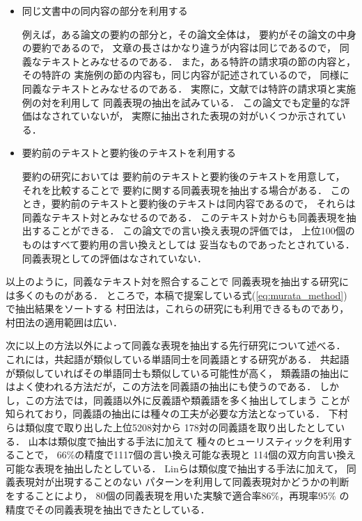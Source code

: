 \begin{itemize}
\item 
  同じ文書中の同内容の部分を利用する

  例えば，ある論文の要約の部分と，その論文全体は，
  要約がその論文の中身の要約であるので，
  文章の長さはかなり違うが内容は同じであるので，
  同義なテキストとみなせるのである．
  また，ある特許の請求項の節の内容と，その特許の
  実施例の節の内容も，同じ内容が記述されているので，
  同様に同義なテキストとみなせるのである．
  実際に，文献\cite{Murata_ntcir3_patent}では特許の請求項と実施例の対を利用して
  同義表現の抽出を試みている．
  この論文でも定量的な評価はなされていないが，
  実際に抽出された表現の対がいくつか示されている．
  
\item 
  要約前のテキストと要約後のテキストを利用する
  
  要約の研究においては
  要約前のテキストと要約後のテキストを用意して，
  それを比較することで
  要約に関する同義表現を抽出する場合がある．
  このとき，要約前のテキストと要約後のテキストは同内容であるので，
  それらは同義なテキスト対とみなせるのである．
  このテキスト対からも同義表現を抽出することができる\cite{Kato1999}．
  この論文での言い換え表現の評価では，
  上位100個のものはすべて要約用の言い換えとしては
  妥当なものであったとされている．
  同義表現としての評価はなされていない．

\end{itemize}

以上のように，同義なテキスト対を照合することで
同義表現を抽出する研究には多くのものがある．
ところで，本稿で提案している式(\ref{eq:murata_method})で抽出結果をソートする
村田法は，これらの研究にも利用できるものであり，
村田法の適用範囲は広い．

次に以上の方法以外によって同義な表現を抽出する先行研究について述べる．
これには，共起語が類似している単語同士を同義語とする研究がある\cite{shimomura93,lin_coling98,yamamoto_kazu_nlp2002,Dekang_Lin_IJCAI03}．
共起語が類似していればその単語同士も類似している可能性が高く，
類義語の抽出\cite{hindle90}にはよく使われる方法だが，この方法を同義語の抽出にも使うのである．
しかし，この方法では，同義語以外に反義語や類義語を多く抽出してしまう
ことが知られており，同義語の抽出には種々の工夫が必要な方法となっている．
下村ら\cite{shimomura93}は類似度で取り出した上位5208対から
178対の同義語を取り出したとしている．
山本\cite{yamamoto_kazu_nlp2002}は類似度で抽出する手法に加えて
種々のヒューリスティックを利用することで，
66\%の精度で1117個の言い換え可能な表現と
114個の双方向言い換え可能な表現を抽出したとしている．
Linら\cite{Dekang_Lin_IJCAI03}は類似度で抽出する手法に加えて，
同義表現対が出現することのない
パターンを利用して同義表現対かどうかの判断をすることにより，
80個の同義表現を用いた実験で適合率86\%，再現率95\%
の精度でその同義表現を抽出できたとしている．

